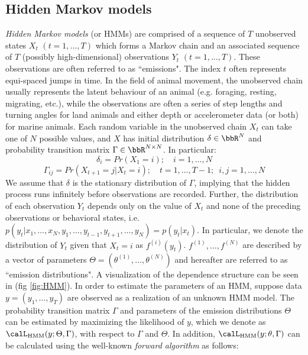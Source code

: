 

\subsection{Hidden Markov models}
\label{subsection:HMMs}

\textit{Hidden Markov models} (or HMMs) are comprised of a sequence of $T$ unobserved states $X_t$ $(t = 1, \ldots, T)$ which forms a Markov chain and an associated sequence of $T$ (possibly high-dimensional) observations $Y_t$ $(t = 1, \ldots, T)$. These observations are often referred to as ``emissions". The index $t$ often represents equi-spaced jumps in time. In the field of animal movement, the unobserved chain usually represents the latent behaviour of an animal (e.g. foraging, resting, migrating, etc.), while the observations are often a series of step lengths and turning angles for land animals and either depth or accelerometer data (or both) for marine animals. Each random variable in the unobserved chain $X_t$ can take one of $N$ possible values, and $X$ has initial distribution $\delta \in \bbR^N$ and probability transition matrix $\Gamma \in \bbR^{N \times N}$. In particular:
%
$$\delta_i = Pr(X_1 = i); \quad i = 1,\ldots,N$$
%
$$\Gamma_{ij} = Pr(X_{t+1} = j | X_t = i); \quad t = 1, \ldots, T-1; \enspace i,j = 1,\ldots,N $$
%
We assume that $\delta$ is the stationary distribution of $\Gamma$, implying that the hidden process runs infinitely before observations are recorded. Further, the distribution of each observation $Y_t$ depends only on the value of $X_t$ and none of the preceding observations or behavioral states, i.e. $p(y_t|x_1,\ldots, x_N, y_1,\ldots,y_{t-1},y_{t+1},\ldots,y_N) = p(y_t|x_t)$. In particular, we denote the distribution of $Y_t$ given that $X_t = i$ as $f^{(i)}(y_t)$. $f^{(1)},\ldots,f^{(N)}$ are described by a vector of parameters $\Theta = (\theta^{(1)},\ldots,\theta^{(N)})$ and hereafter are referred to as ``emission distributions". A visualization of the dependence structure can be seen in (fig \ref{fig:HMM}).
In order to estimate the parameters of an HMM, suppose data $y = (y_1,\ldots,y_T)$ are observed as a realization of an unknown HMM model. The probability transition matrix $\Gamma$ and parameters of the emission distributions $\Theta$ can be estimated by maximizing the likelihood of $y$, which we denote as $\calL_{\text{HMM}}(y;\Theta,\Gamma)$, with respect to $\Gamma$ and $\Theta$. In addition, $\calL_{\text{HMM}}(y;\theta,\Gamma)$ can be calculated using the well-known \textit{forward algorithm} \cite{Zucchini:2016} as follows:
